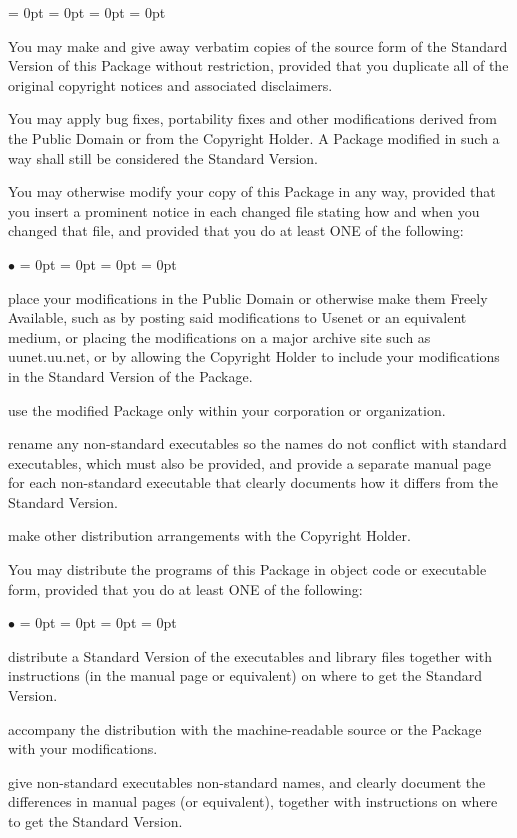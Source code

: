 \documentclass{article}
\newcounter{enumctr}
\newenvironment{enumate}{%
\begin{list}{\arabic{enumctr}}{
\usecounter{enumctr}
\parsep  = 0pt
\parskip = 0pt
\topsep  = 0pt
\itemsep = 0pt
}}{\end{list}}
\newenvironment{itize}%
{\begin{list}%
  {$\bullet$%
  }%
  {\parsep  = 0pt%
   \parskip = 0pt%
   \topsep  = 0pt%
   \itemsep = 0pt%
  }%
}%
{\end{list}%
}
\begin{document}
{\begin{enumate}
\item  You may make and give away verbatim copies of the source form of the Standard Version of this Package without restriction, provided that you duplicate all of the original copyright notices and associated disclaimers.
\item  You may apply bug fixes, portability fixes and other modifications derived from the Public Domain or from the Copyright Holder. A Package modified in such a way shall still be considered the Standard Version.
\item  You may otherwise modify your copy of this Package in any way, provided that you insert a prominent notice in each changed file stating how and when you changed that file, and provided that you do at least ONE of the following: 
	\begin{itize}
	\item  place your modifications in the Public Domain or otherwise make them Freely Available, such as by posting said modifications to Usenet or an equivalent medium, or placing the modifications on a major archive site such as uunet.uu.net, or by allowing the Copyright Holder to include your modifications in the Standard Version of the Package.
	\item  use the modified Package only within your corporation or organization.
	\item  rename any non-standard executables so the names do not conflict with standard executables, which must also be provided, and provide a separate manual page for each non-standard executable that clearly documents how it differs from the Standard Version.
	\item  make other distribution arrangements with the Copyright Holder.
	\end{itize}
\item  You may distribute the programs of this Package in object code or executable form, provided that you do at least ONE of the following: 
	\begin{itize}
	\item  distribute a Standard Version of the executables and library files together with instructions (in the manual page or equivalent) on where to get the Standard Version.
	\item  accompany the distribution with the machine-readable source or the Package with your modifications.
	\item  give non-standard executables non-standard names, and clearly document the differences in manual pages (or equivalent), together with instructions on where to get the Standard Version.

\end{itize}
\end{enumate}}
\end{document}
